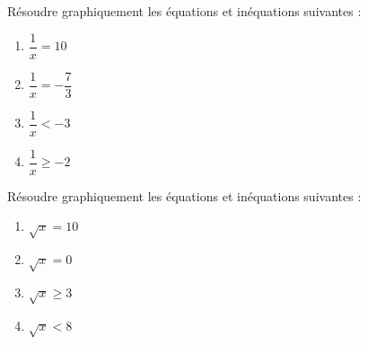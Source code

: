\documentclass[a4paper]{article}
\begin{document}
%

\exo[4 points] Résoudre graphiquement les équations et inéquations suivantes :
\smallskip
\begin{multicols}{4}
  \begin{enumerate}
    \item $\dfrac{1}{x}=10$
    \item $\dfrac{1}{x}=-\dfrac{7}{3}$
    \item $\dfrac{1}{x}<-3$
    \item $\dfrac{1}{x}\geq -2$
  \end{enumerate}
\end{multicols}

\dotfill{}

\bigskip

\exo[4 points] Résoudre graphiquement les équations et inéquations suivantes :
\smallskip
\begin{multicols}{4}
  \begin{enumerate}
    \item $\sqrt{x}=10$
    \item $\sqrt{x}=0$
    \item $\sqrt{x}\geq 3$
    \item $\sqrt{x}<8$
  \end{enumerate}
\end{multicols}
\end{document}
